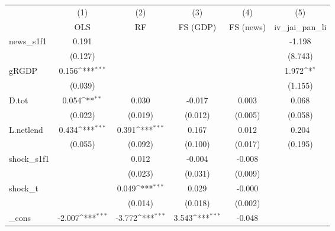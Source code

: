 {
\def\sym#1{\ifmmode^{#1}\else\(^{#1}\)\fi}
\begin{tabular}{l*{5}{c}}
\toprule
            &\multicolumn{1}{c}{(1)}&\multicolumn{1}{c}{(2)}&\multicolumn{1}{c}{(3)}&\multicolumn{1}{c}{(4)}&\multicolumn{1}{c}{(5)}\\
            &\multicolumn{1}{c}{OLS}&\multicolumn{1}{c}{RF}&\multicolumn{1}{c}{FS (GDP)}&\multicolumn{1}{c}{FS (news)}&\multicolumn{1}{c}{iv\_jai\_pan\_li}\\
\midrule
news\_s1f1   &       0.191         &                     &                     &                     &      -1.198         \\
            &     (0.127)         &                     &                     &                     &     (8.743)         \\
\addlinespace
gRGDP       &       0.156\sym{***}&                     &                     &                     &       1.972\sym{*}  \\
            &     (0.039)         &                     &                     &                     &     (1.155)         \\
\addlinespace
D.tot       &       0.054\sym{**} &       0.030         &      -0.017         &       0.003         &       0.068         \\
            &     (0.022)         &     (0.019)         &     (0.012)         &     (0.005)         &     (0.058)         \\
\addlinespace
L.netlend   &       0.434\sym{***}&       0.391\sym{***}&       0.167         &       0.012         &       0.204         \\
            &     (0.055)         &     (0.092)         &     (0.100)         &     (0.017)         &     (0.195)         \\
\addlinespace
shock\_s1f1  &                     &       0.012         &      -0.004         &      -0.008         &                     \\
            &                     &     (0.023)         &     (0.031)         &     (0.009)         &                     \\
\addlinespace
shock\_t     &                     &       0.049\sym{***}&       0.029         &      -0.000         &                     \\
            &                     &     (0.014)         &     (0.018)         &     (0.002)         &                     \\
\addlinespace
\_cons      &      -2.007\sym{***}&      -3.772\sym{***}&       3.543\sym{***}&      -0.048         &                     \\

\end{tabular}}
